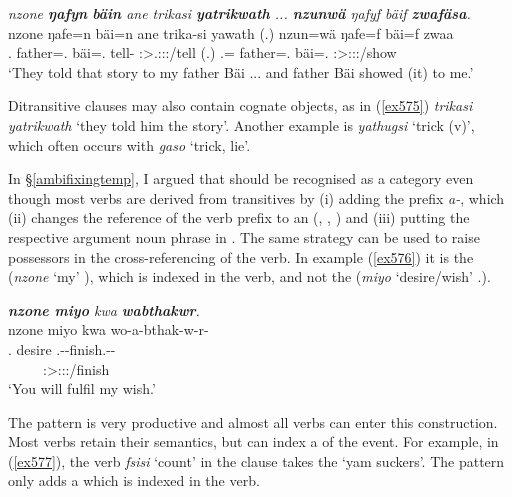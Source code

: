 \begin{exe}
	\ex \emph{nzone \textbf{ŋafyn} \textbf{bäin} ane trikasi \textbf{yatrikwath} ... \textbf{nzunwä} ŋafyf bäif \textbf{zwafäsa}.}\\
	\gll nzone ŋafe=n bäi=n ane trika-si yawath (.) nzun=wä ŋafe=f bäi=f zwaa\\
	\Fsg.{\Poss} father=\Dat.{\Sg} bäi=\Dat.{\Sg} {\Dem} tell-{\Nmlz} \Stpl:\Sbj>\Tsg.\Masc:\Io:\Pst:\Ipfv/tell (.) \Fsg.\Dat={\Emph} father=\Erg.{\Sg} bäi=\Erg.{\Sg} \Stsg:\Sbj>\Fsg:\Io:\Pst:\Pfv/show\\
	\trans `They told that story to my father Bäi ... and father Bäi showed (it) to me.'\\
	\label{ex575}
\end{exe}

Ditransitive clauses may also contain cognate objects, as in (\ref{ex575}) \emph{trikasi yatrikwath} `they told him the story'. Another example is \emph{yathugsi} `trick (v)', which often occurs with \emph{gaso} `trick, lie'.

In {\S}\ref{ambifixingtemp}, I argued that  should be recognised as a category even though most  verbs are derived from transitives by (i) adding the  prefix \emph{a-}, which (ii) changes the reference of the verb prefix to an  (, , ) and (iii) putting the respective argument noun phrase in  . The same strategy can be used to raise possessors in the cross-referencing of the verb. In example (\ref{ex576}) it is the  (\emph{nzone} `my' \Fsg), which is indexed in the verb, and not the  (\emph{miyo} `desire/wish' \Tsg.\F).

\begin{exe}
	\ex \emph{\textbf{nzone miyo} kwa \textbf{wabthakwr}.}\\
	\glll nzone miyo kwa wo-a-bthak-w-r-\Zero{}\\
	\Fsg.{\Poss} desire {\Fut} \Fsg.\Alph-\Vc-finish.\Ext-\Lk-\Stsg{}\\
	~ ~ ~ {\Stsg:\Sbj>\Fsg:\Io:\Nonpast:\Ipfv/finish}\\
	\trans `You will fulfil my wish.'
	\label{ex576}
\end{exe}

The  pattern is very productive and almost all  verbs can enter this construction. Most verbs retain their  semantics, but can index a  of the event. For example, in (\ref{ex577}), the verb \emph{fsisi} `count' in the clause takes the  `yam suckers'. The  pattern only adds a  which is indexed in the verb.

